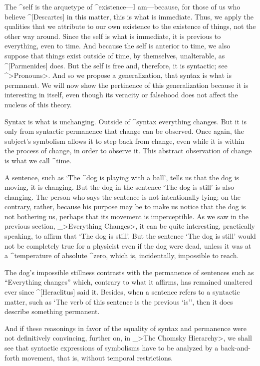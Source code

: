 The ^{self} is the arquetype of ^{existence}---I am---because, for those
of us who believe ^[Descartes] in this matter, this is what is
immediate. Thus, we apply the qualities that we attribute to our own
existence to the existence of things, not the other way around. Since
the self is what is immediate, it is previous to everything, even to
time. And because the self is anterior to time, we also suppose that
things exist outside of time, by themselves, unalterable, as
^[Parmenides] does. But the self is free and, therefore, it is
syntactic; see ^>Pronouns>. And so we propose a generalization, that
syntax is what is permanent. We will now show the pertinence of this
generalization because it is interesting in itself, even though its
veracity or falsehood does not affect the nucleus of this theory.

Syntax is what is unchanging. Outside of ^{syntax} everything changes.
But it is only from syntactic permanence that change can be observed.
Once again, the subject's symbolism allows it to step back from change,
even while it is within the process of change, in order to observe it.
This abstract observation of change is what we call ^{time}.

A sentence, such as `The ^{dog} is playing with a ball', tells us that
the dog is moving, it is changing. But the dog in the sentence `The dog
is still' is also changing. The person who says the sentence is not
intentionally lying; on the contrary, rather, because his purpose may be
to make us notice that the dog is not bothering us, perhaps that its
movement is imperceptible. As we saw in the previous section,
_>Everything Changes>, it can be quite interesting, practically
speaking, to affirm that `The dog is still'. But the sentence `The dog
is still' would not be completely true for a physicist even if the dog
were dead, unless it was at a ^{temperature} of absolute ^{zero}, which
is, incidentally, impossible to reach.

The dog's impossible stillness contrasts with the permanence of
sentences such as ``Everything changes'' which, contrary to what it
affirms, has remained unaltered ever since ^[Heraclitus] said it.
Besides, when a sentence refers to a syntactic matter, such as `The verb
of this sentence is the previous `is'{}', then it does describe
something permanent.

And if these reasonings in favor of the equality of syntax and
permanence were not definitively convincing, further on, in _>The
Chomsky Hierarchy>, we shall see that syntactic expressions of
symbolisms have to be analyzed by a back-and-forth movement, that is,
without temporal restrictions.


